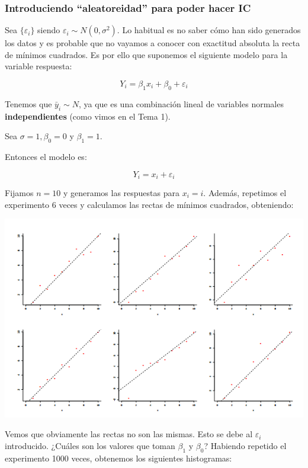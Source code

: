 \begin{itemize}
\begin{example}
\end{example}





\subsubsection{Introduciendo ``aleatoreidad'' para poder hacer IC}

Sea $\{ε_i\}$ siendo $ε_i \sim N(0,σ^2)$. Lo habitual es no saber cómo han sido generados los datos y es probable que no vayamos a conocer con exactitud absoluta la recta de mínimos cuadrados. Es por ello que suponemos el siguiente modelo para la variable respuesta:

\[
Y_i = β_1 x_i + β_0 + ε_i
\]


Tenemos que $\bar{y}_i \sim N$, ya que es una combinación lineal de variables normales \textbf{independientes} (como vimos en el Tema 1).


\begin{example}
Sea $σ=1, β_0 = 0$ y $β_1 = 1$.

Entonces el modelo es:

\[
Y_i = x_i + ε_i
\]

Fijamos $n=10$ y generamos las respuestas para $x_i = i$. Además, repetimos el experimento 6 veces y calculamos las rectas de mínimos cuadrados, obteniendo:

\begin{center}
\includegraphics[scale=0.6]{img/6ejemplosRegresion.png}
\end{center}

Vemos que obviamente las rectas no son las mismas. Esto se debe al $ε_i$ introducido. ¿Cuáles son los valores que toman $β_1$ y $β_0$? Habiendo repetido el experimento 1000 veces, obtenemos los siguientes histogramas:


\end{example}
\end{itemize}
